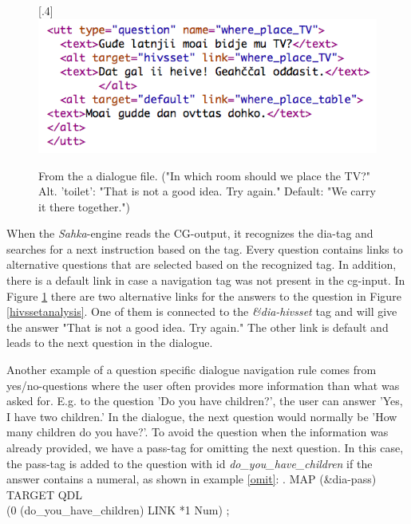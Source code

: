 \documentclass[11pt]{article}
\begin{document}
\begin{figure}[htbp]
\begin{center}
\scalebox{.4}[.4]{\includegraphics{presentation/img/whereTV.png}}\\
\caption{From the a dialogue file. ("In which room should we place the TV?" Alt. 'toilet': "That is not a good idea. Try again." Default: "We carry it there together.") 
}
\label{altlinks}
\end{center}
\end{figure}

When the \textit{Sahka}-engine reads the CG-output, it recognizes the dia-tag and searches for a next instruction based on the tag.  Every question contains links to alternative questions that are selected based on the recognized tag. In addition, there is a default link in case a navigation tag was not present in the cg-input. In Figure \ref{altlinks} there are two alternative links for the answers to the question in Figure \ref{hivssetanalysis}. One of them is connected to the \textit{\&dia-hivsset} tag and will give the answer "That is not a good idea. Try again." The other link is default and leads to the next question in the dialogue. 

Another example of a question specific dialogue navigation rule comes from yes/no-questions where the user often provides more information than what was asked for. E.g. to the question 'Do you have children?', the user can answer 'Yes, I have two children.' In the dialogue, the next question would normally be 'How many children do you have?'. To avoid the question when the information was already provided, we have a pass-tag for omitting the next question. In this case, the pass-tag is added to the question with id \textit{do\_you\_have\_children} if the answer contains a numeral, as shown in example \ref{omit}:
\ex.\label{omit} \small MAP (\&dia-pass) TARGET QDL \\ (0 (do\_you\_have\_children) LINK *1 Num) ;


\end{document}
